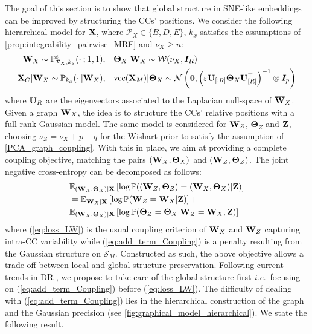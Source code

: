 The goal of this section is to show that global structure in SNE-like embeddings can be improved by structuring the CCs' positions. We consider the following hierarchical model for $\mathbf{X}$, where $\mathcal{P}_{X} \in \{B,D,E\}$, $k_x$ satisfies the assumptions of \cref{prop:integrability_pairwise_MRF} and $\nu_{X} \geq n$:
\begin{align*}
    \mathbf{W}_{X} \sim \mathbb{P}_{\mathcal{P}_X,k_x}^{\varepsilon}(\cdot \: ; \bm{1},1), &\quad \bm{\Theta}_{X} | \mathbf{W}_{X} \sim \mathcal{W}(\nu_{X}, \bm{I}_{R}) \\
    \mathbf{X}_{C} |\mathbf{W}_{X} \sim \mathbb{P}_{k_x}(\cdot \:| \mathbf{W}_{X}), &\quad \mathrm{vec}(\mathbf{X}_{M}) | \bm{\Theta}_{X} \sim \mathcal{N}\left(\bm{0}, \left(\varepsilon \mathbf{U}_{[:R]}  \bm{\Theta}_{X}\mathbf{U}^\top_{[R]}\right)^{-1} \otimes \bm{I}_p\right)
\end{align*}
where $\mathbf{U}_{R}$ are the eigenvectors associated to the Laplacian null-space of $\overline{\mathbf{W}}_{X}$. Given a graph $\mathbf{W}_{X}$, the idea is to structure the CCs' relative positions with a full-rank Gaussian model.
The same model is considered for $\mathbf{W}_{Z}$, $\bm{\Theta}_{Z}$ and $\mathbf{Z}$, choosing $\nu_{Z} = \nu_{X} + p - q$ for the Wishart prior to satisfy the assumption of \cref{PCA_graph_coupling}.  With this in place, we aim at providing a complete coupling objective, matching the pairs  $(\mathbf{W}_{X},\bm{\Theta}_{X})$ and  $(\mathbf{W}_{Z},\bm{\Theta}_{Z})$. The joint negative cross-entropy can be decomposed as follows:
\begin{align}
    &\mathbb{E}_{(\mathbf{W}_{X}, \bm{\Theta}_{X})|\mathbf{X}}\left[\log \mathbb{P}((\mathbf{W}_{Z},\bm{\Theta}_{Z}) = (\mathbf{W}_{X},\bm{\Theta}_{X}) | \mathbf{Z})\right] \nonumber\\
    &= \mathbb{E}_{\mathbf{W}_{X}|\mathbf{X}}\left[\log \mathbb{P}(\mathbf{W}_{Z} = \mathbf{W}_{X} | \mathbf{Z})\right] + \label{eq:loss_LW} \\
    & \mathbb{E}_{(\mathbf{W}_{X},\bm{\Theta}_{X})|\mathbf{X}}\left[ \log \mathbb{P}(\bm{\Theta}_{Z} = \bm{\Theta}_{X}| \mathbf{W}_{Z} = \mathbf{W}_{X}, \mathbf{Z}) \right] \label{eq:add_term_Coupling}
\end{align}
where (\ref{eq:loss_LW}) is the usual coupling criterion of $\mathbf{W}_X$ and $\mathbf{W}_Z$ capturing intra-CC variability while (\ref{eq:add_term_Coupling}) is a penalty resulting from the Gaussian structure on $\mathcal{S}_{M}$. Constructed as such, the above objective allows a trade-off between local and global structure preservation. Following current trends in DR \cite{kobak2021initialization}, we propose to take care of the global structure first \textit{i.e.}\ focusing on (\ref{eq:add_term_Coupling}) before (\ref{eq:loss_LW}). The difficulty of dealing with (\ref{eq:add_term_Coupling}) lies in the hierarchical construction of the graph and the Gaussian precision (see \cref{fig:graphical_model_hierarchical}). We state the following result.

